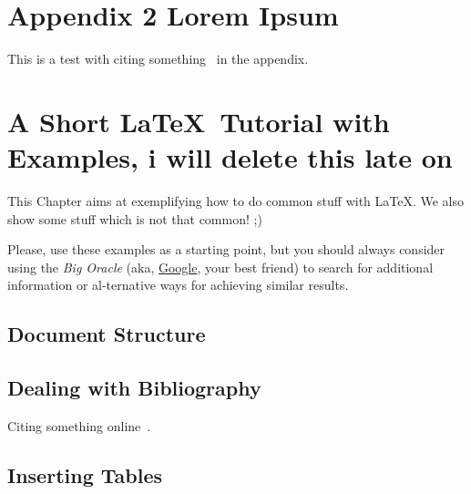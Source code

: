 


%

\makeatletter
\newcommand{\ntifpkgloaded}{%
	\@ifpackageloaded%
}
\makeatother

\chapter{Appendix 2 Lorem Ipsum}
\label{app:lorem_ipsum2}

This is a test with citing something~\cite{ecoop12-dias} in the appendix.

\chapter{A Short \LaTeX\ Tutorial with Examples, i will delete this late on}
\label{cha:a_short_latex_tutorial_with_examples}

This Chapter aims at exemplifying how to do common stuff with \LaTeX. We also show some stuff which is not that common! ;)

Please, use these examples as a starting point, but you should always consider using the \emph{Big Oracle} (aka, \href{http://www.google.com}{Google}, your best friend) to search for additional information or al-ternative ways for achieving similar results.

\section{Document Structure} %
\label{sec:document_structure}



\section{Dealing with Bibliography} %
\label{sec:dealing_with_bibliography}

Citing something online~\cite{wiki:shuntingyard,flex,bison}.



\section{Inserting Tables} %
\label{sec:inserting_tables}

